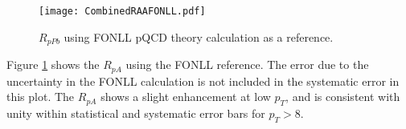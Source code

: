 %

\begin{figure}[h!]
  \centering
  \texttt{[image: CombinedRAAFONLL.pdf]}\\
  \caption{$R_{pPb}$ using FONLL pQCD theory calculation as a reference.} \label{fig:CombinedRAAFONLL}
\end{figure}

Figure \ref{fig:CombinedRAAFONLL} shows the $R_{pA}$ using the FONLL reference. The error due to the uncertainty in the FONLL calculation is not included in the systematic error in this plot. The $R_{pA}$ shows a slight enhancement at low $p_{T}$, and is consistent with unity within statistical and systematic error bars for $p_{T} > 8$. 



%






